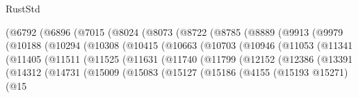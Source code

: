 \begin{lexlean}{RustStd}
\begin{coremodule}
                        (@6792
                          (@6896
                            (@7015
                              (@8024
                                (@8073
                                  (@8722
                                    (@8785
                                      (@8889
                                        (@9913
                                          (@9979
                                            (@10188
                                              (@10294
                                                (@10308
                                                  (@10415
                                                    (@10663
                                                      (@10703
                                                        (@10946
                                                          (@11053
                                                            (@11341
                                                              (@11405
                                                                (@11511
                                                                  (@11525
                                                                    (@11631
                                                                      (@11740
                                                                        (@11799
                                                                          (@12152
                                                                            (@12386
                                                                              (@13391
                                                                                (@14312
                                                                                  (@14731
                                                                                    (@15009
                                                                                      (@15083
                                                                                        (@15127
                                                                                          (@15186
                                                                                            (@4155
                                                                                              (@15193
                                                                                                @15271)
                                                                                              (@15

\end{coremodule}
\end{lexlean}
